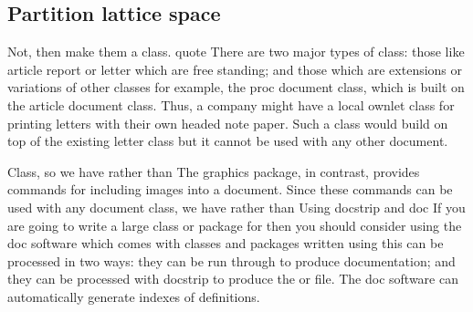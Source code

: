 \documentclass{article}
\begin{document}
\subsection{Partition lattice space}
Not, then make them a class. quote There are two major types of class: those like article report or letter which are free standing; and those which are extensions or variations of other classes for example, the proc document class, which is built on the article document class. Thus, a company might have a local ownlet class for printing letters with their own headed note paper. Such a class would build on top of the existing letter class but it cannot be used with any other document.

Class, so we have rather than The graphics package, in contrast, provides commands for including images into a document. Since these commands can be used with any document class, we have rather than Using docstrip and doc If you are going to write a large class or package for then you should consider using the doc software which comes with classes and packages written using this can be processed in two ways: they can be run through to produce documentation; and they can be processed with docstrip to produce the or file. The doc software can automatically generate indexes of definitions.
\end{document}
